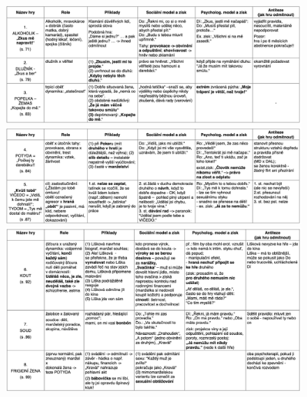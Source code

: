     \begin{figure}
        \centering
        \includegraphics[width=\textwidth]{pictures/1.png}
        \includegraphics[width=\textwidth]{pictures/2.png}
        \includegraphics[width=\textwidth]{pictures/3.png}
    \end{figure}{}

